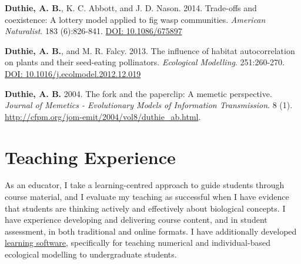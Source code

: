 \documentclass[letterpaper]{article}
\begin{document}
\begin{etaremune}
\item {\bf Duthie, A. B.}, K. C. Abbott, and J. D. Nason. 2014. Trade-offs and coexistence: A lottery model applied to fig wasp communities. {\it American Naturalist}. 183 (6):826-841. \href{http://www.jstor.org/stable/10.1086/675897}{DOI: 10.1086/675897}
\item {\bf Duthie, A. B.}, and M. R. Falcy. 2013. The influence of habitat autocorrelation on plants and their seed-eating pollinators. {\it Ecological Modelling}. 251:260-270. \href{http://www.sciencedirect.com/science/article/pii/S0304380013000021}{DOI: 10.1016/j.ecolmodel.2012.12.019}
\item {\bf Duthie, A. B.} 2004. The fork and the paperclip: A memetic perspective. {\it Journal of Memetics - Evolutionary Models of Information Transmission}. 8 (1). \href{http://cfpm.org/jom-emit/2004/vol8/duthie_ab.html}{http://cfpm.org/jom-emit/2004/vol8/duthie\_ab.html}.
\end{etaremune}


\section*{Teaching Experience}
\hrulefill


As an educator, I take a learning-centred approach to guide students through course material, and I evaluate my teaching as successful when I have evidence that students are thinking actively and effectively about biological concepts. I have experience developing and delivering course content, and in student assessment, in both traditional and online formats. I have additionally developed \href{https://bradduthie.shinyapps.io/EcoEdu/}{learning software}, specifically for teaching numerical and individual-based ecological modelling to undergraduate students.

\hrulefill

\end{document}
